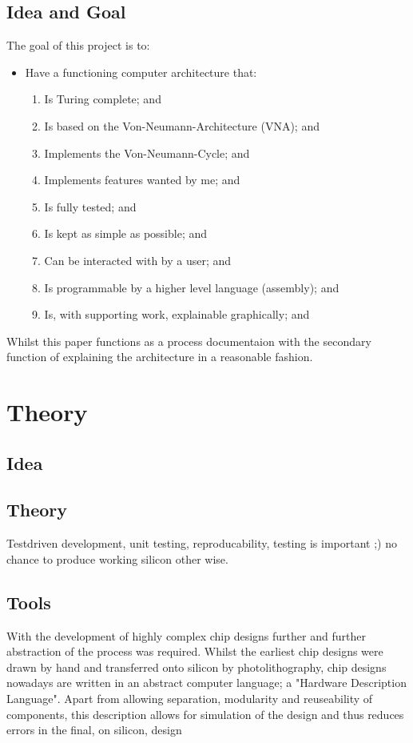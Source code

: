\section{Idea and Goal}
The goal of this project is to: 
\begin{itemize}
  \item Have a functioning computer architecture that:
 \begin{enumerate}
    \item Is Turing complete; and
    \item Is based on the Von-Neumann-Architecture (VNA); and
    \item Implements the Von-Neumann-Cycle; and
    \item Implements features wanted by me; and  
    \item Is fully tested; and
    \item Is kept as simple as possible; and
    \item Can be interacted with by a user; and
    \item Is programmable by a higher level language (assembly); and
    \item Is, with supporting work, explainable graphically; and
  \end{enumerate}
\end{itemize}

Whilst this paper functions as a process documentaion with the secondary function of explaining the architecture in a reasonable fashion.

\chapter{Theory}

\section{Idea}

\section{Theory}

Testdriven development, unit testing, reproducability, testing is important ;) no chance to produce working silicon other wise.

\section{Tools}
With the development of highly complex chip designs further and further abstraction of the process was required. Whilst the earliest chip designs were drawn by hand and transferred onto silicon by photolithography, chip designs nowadays are written in an abstract computer language; a "Hardware Description Language". Apart from allowing separation, modularity and reuseability of components, this description allows for simulation of the design and thus reduces errors in the final, on silicon, design 

